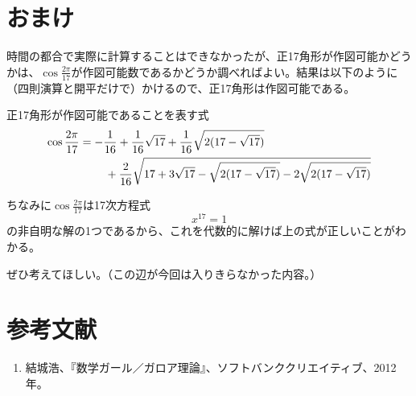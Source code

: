 %
\clearpage
\section{おまけ}
時間の都合で実際に計算することはできなかったが、正17角形が作図可能かどうかは、$\cos \frac{2\pi}{17}$が作図可能数であるかどうか調べればよい。結果は以下のように（四則演算と開平だけで）かけるので、正17角形は作図可能である。
\begin{screen}
  正17角形が作図可能であることを表す式
  \begin{align*}
    \cos \frac{2\pi}{17} &= -\frac{1}{16} + \frac{1}{16}\sqrt{17} + \frac{1}{16}\sqrt{2(17 - \sqrt{17})}\\
    & \hspace{8mm} + \frac{2}{16}\sqrt{17 + 3\sqrt{17} - \sqrt{2(17 - \sqrt{17})} - 2\sqrt{2(17 - \sqrt{17})}}
  \end{align*}
\end{screen}\par
ちなみに$\cos \frac{2\pi}{17}$は17次方程式
$$ x^{17} = 1$$
の非自明な解の1つであるから、これを代数的に解けば上の式が正しいことがわかる。\par
ぜひ考えてほしい。（この辺が今回は入りきらなかった内容。）

%
\section*{参考文献}
\begin{enumerate}
  \item 結城浩、『数学ガール／ガロア理論』、ソフトバンククリエイティブ、2012年。
\end{enumerate}

%

